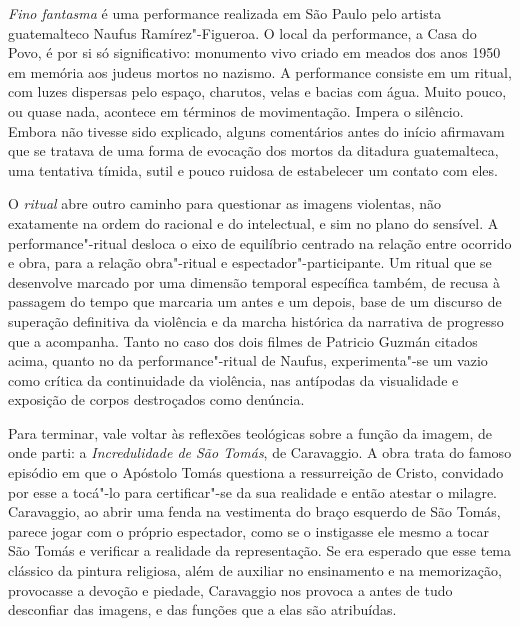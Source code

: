 \asterisc

\emph{Fino fantasma} é uma performance realizada em São Paulo pelo
artista guatemalteco Naufus Ramírez"-Figueroa. O local da performance, a
Casa do Povo, é por si só significativo: monumento vivo criado em meados
dos anos 1950 em memória aos judeus mortos no nazismo. A performance
consiste em um ritual, com luzes dispersas pelo espaço, charutos, velas
e bacias com água. Muito pouco, ou quase nada, acontece em términos de
movimentação. Impera o silêncio. Embora não tivesse sido explicado,
alguns comentários antes do início afirmavam que se tratava de uma forma
de evocação dos mortos da ditadura guatemalteca, uma tentativa tímida,
sutil e pouco ruidosa de estabelecer um contato com eles.

O \emph{ritual} abre outro caminho para questionar as imagens violentas,
não exatamente na ordem do racional e do intelectual, e sim no plano do
sensível. A performance"-ritual desloca o eixo de equilíbrio centrado na
relação entre ocorrido e obra, para a relação obra"-ritual e
espectador"-participante. Um ritual que se desenvolve marcado por uma
dimensão temporal específica também, de recusa à passagem do tempo que
marcaria um antes e um depois, base de um discurso de superação definitiva da
violência e da marcha histórica da narrativa de progresso que a
acompanha. Tanto no caso dos dois filmes de Patricio Guzmán citados
acima, quanto no da performance"-ritual de Naufus, experimenta"-se um vazio
como crítica da continuidade da violência, nas antípodas da visualidade
e exposição de corpos destroçados como denúncia.

\asterisc

Para terminar, vale voltar às reflexões teológicas sobre a função da
imagem, de onde parti: a \emph{Incredulidade de São Tomás}, de
Caravaggio. A obra trata do famoso episódio em que o Apóstolo Tomás
questiona a ressurreição de Cristo, convidado por esse a tocá"-lo para
certificar"-se da sua realidade e então atestar o milagre. Caravaggio,
ao abrir uma fenda na vestimenta do braço esquerdo de São Tomás, parece
jogar com o próprio espectador, como se o instigasse ele mesmo a tocar São
Tomás e verificar a realidade da representação. Se era esperado que esse
tema clássico da pintura religiosa, além de auxiliar no ensinamento e na
memorização, provocasse a devoção e piedade, Caravaggio nos provoca a
antes de tudo desconfiar das imagens, e das funções que a elas são
atribuídas.

